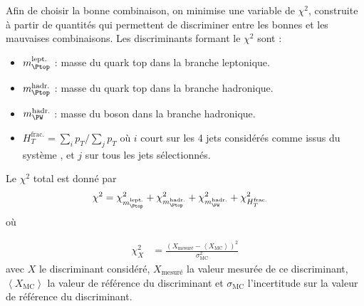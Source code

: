 \medskip

Afin de choisir la bonne combinaison, on minimise une variable de $\chi^2$, construite à partir de quantités qui permettent de discriminer entre les bonnes et les mauvaises combinaisons. Les discriminants formant le $\chi^2$ sont :
\begin{itemize}
    \item $m_{\Ptop}^{\text{lept.}}$ : masse du quark top dans la branche leptonique.
    \item $m_{\Ptop}^{\text{hadr.}}$ : masse du quark top dans la branche hadronique.
    \item $m_{\PW}^{\text{hadr.}}$ : masse du boson \PW dans la branche hadronique.
    \item $H_{T}^{\text{frac.}} = \sum\limits_i{p_T} / \sum\limits_j{p_T}$ où $i$ court sur les 4 jets considérés comme issus du système \ttbar, et $j$ sur tous les jets sélectionnés.
\end{itemize}

Le $\chi^2$ total est donné par
\begin{align} \label{eq:chi2}
  \chi^2 &= \chi^2_{m_{\Ptop}^{\text{lept.}}} + \chi^2_{m_{\Ptop}^{\text{hadr.}}} + \chi^2_{m_{\PW}^{\text{hadr.}}} + \chi^2_{H_{T}^{\text{frac.}}}
\end{align}
où

\begin{align*}
  \chi^2_X &= \frac{\left( X_\text{mesuré} - \left\langle X_\text{MC} \right\rangle \right)^2}{\sigma_\text{MC}^2}
\end{align*}
avec $X$ le discriminant considéré, $X_\text{mesuré}$ la valeur mesurée de ce discriminant, $\left\langle X_\text{MC} \right\rangle$ la valeur de référence du discriminant et $\sigma_\text{MC}$ l'incertitude sur la valeur de référence du discriminant.

